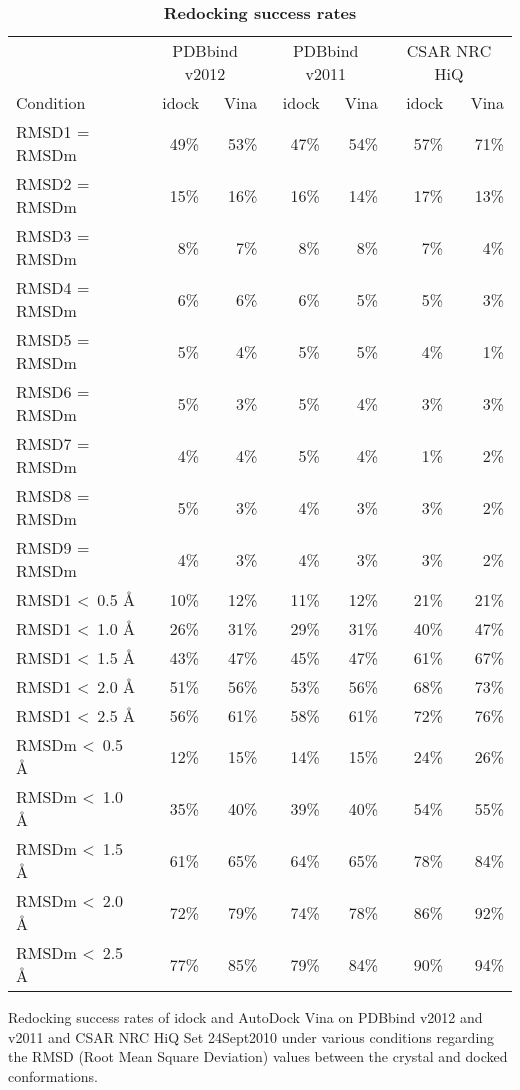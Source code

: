 \documentclass[10pt]{article}
\begin{document}
\begin{table}[!ht]
\caption{
\bf{Redocking success rates}}
\begin{tabular}{lrrrrrr}
\hline
& \multicolumn{2}{c}{PDBbind v2012} & \multicolumn{2}{c}{PDBbind v2011} & \multicolumn{2}{c}{CSAR NRC HiQ}\\
Condition & idock & Vina & idock & Vina & idock & Vina\\
\hline
RMSD1 = RMSDm & 49\% & 53\% & 47\% & 54\% & 57\% & 71\%\\
RMSD2 = RMSDm & 15\% & 16\% & 16\% & 14\% & 17\% & 13\%\\
RMSD3 = RMSDm &  8\% &  7\% &  8\% &  8\% &  7\% &  4\%\\
RMSD4 = RMSDm &  6\% &  6\% &  6\% &  5\% &  5\% &  3\%\\
RMSD5 = RMSDm &  5\% &  4\% &  5\% &  5\% &  4\% &  1\%\\
RMSD6 = RMSDm &  5\% &  3\% &  5\% &  4\% &  3\% &  3\%\\
RMSD7 = RMSDm &  4\% &  4\% &  5\% &  4\% &  1\% &  2\%\\
RMSD8 = RMSDm &  5\% &  3\% &  4\% &  3\% &  3\% &  2\%\\
RMSD9 = RMSDm &  4\% &  3\% &  4\% &  3\% &  3\% &  2\%\\
\noalign{\smallskip}
RMSD1 \textless\ 0.5 \AA & 10\% & 12\% & 11\% & 12\% & 21\% & 21\%\\
RMSD1 \textless\ 1.0 \AA & 26\% & 31\% & 29\% & 31\% & 40\% & 47\%\\
RMSD1 \textless\ 1.5 \AA & 43\% & 47\% & 45\% & 47\% & 61\% & 67\%\\
RMSD1 \textless\ 2.0 \AA & 51\% & 56\% & 53\% & 56\% & 68\% & 73\%\\
RMSD1 \textless\ 2.5 \AA & 56\% & 61\% & 58\% & 61\% & 72\% & 76\%\\
\noalign{\smallskip}
RMSDm \textless\ 0.5 \AA & 12\% & 15\% & 14\% & 15\% & 24\% & 26\%\\
RMSDm \textless\ 1.0 \AA & 35\% & 40\% & 39\% & 40\% & 54\% & 55\%\\
RMSDm \textless\ 1.5 \AA & 61\% & 65\% & 64\% & 65\% & 78\% & 84\%\\
RMSDm \textless\ 2.0 \AA & 72\% & 79\% & 74\% & 78\% & 86\% & 92\%\\
RMSDm \textless\ 2.5 \AA & 77\% & 85\% & 79\% & 84\% & 90\% & 94\%\\
\end{tabular}
\begin{flushleft}\label{SuccessRate} Redocking success rates of idock and AutoDock Vina on PDBbind v2012 and v2011 and CSAR NRC HiQ Set 24Sept2010 under various conditions regarding the RMSD (Root Mean Square Deviation) values between the crystal and docked conformations.
\end{flushleft}
\label{tab:label}
 \end{table}
\end{document}
